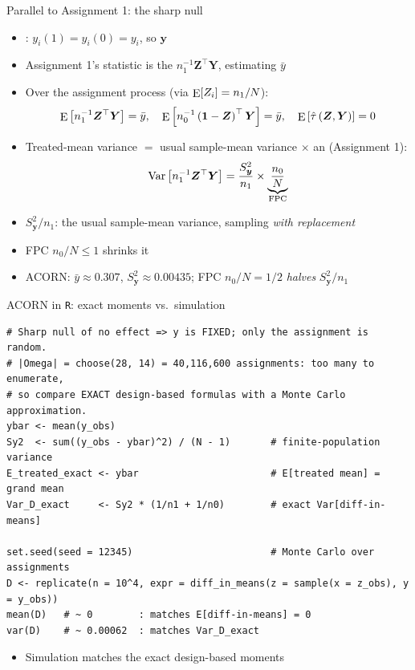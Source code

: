 \documentclass[table, xcolor = {dvipsnames}, 9pt]{beamer}
\theoremstyle{plain}
\newcommand{\mh}[1]{{\color{magenta}{#1}}}
\DeclareMathOperator{\E}{\rm{E}}
\DeclareMathOperator{\Var}{\rm{Var}}
\begin{document}
\begin{frame}[t]{Parallel to Assignment 1: the sharp null}
\small
\begin{itemize} \vfill
\item \mh{Sharp null of no effect}: $y_i(1) = y_i(0) = y_i$, so $\bm{y}$ \mh{fixed} \vfill
\item Assignment 1's statistic is the \mh{treated-group mean} $n_1^{-1}\bm{Z}^{\top}\bm{Y}$, estimating $\bar{y}$ \vfill
\item Over the assignment process (via $\E[Z_i] = n_1/N$): \vfill 
\begin{equation*}
\E\left[n_1^{-1}\bm{Z}^{\top}\bm{Y}\right] = \bar{y}, \quad \E\left[n_0^{-1}\left(\bm{1} - \bm{Z}\right)^{\top}\bm{Y}\right] = \bar{y}, \quad \E\left[\hat{\tau}\left(\bm{Z}, \bm{Y}\right)\right] = 0
\end{equation*} \vfill
\item Treated-mean variance $=$ usual sample-mean variance $\times$ an \mh{FPC} (Assignment 1): \vfill
\begin{equation*}
\Var\left[n_1^{-1}\bm{Z}^{\top}\bm{Y}\right] = \frac{S^2_{\bm{y}}}{n_1} \times \underbrace{\frac{n_0}{N}}_{\text{FPC}}
\end{equation*} \vfill
\item[] $S^2_{\bm{y}}/n_1$: the usual sample-mean variance, sampling \emph{with replacement} \vfill
\item[] FPC $n_0/N \le 1$ shrinks it \vfill
\item ACORN: $\bar{y} \approx 0.307$, $S^2_{\bm{y}} \approx 0.00435$; FPC $n_0/N = 1/2$ \emph{halves} $S^2_{\bm{y}}/n_1$ \vfill
\end{itemize} \vfill
\end{frame}
\begin{frame}[fragile]{ACORN in \texttt{R}: exact moments vs.\ simulation}
\begin{lstlisting}[style=Rstyle, basicstyle=\ttfamily\tiny, frame=single]
# Sharp null of no effect => y is FIXED; only the assignment is random.
# |Omega| = choose(28, 14) = 40,116,600 assignments: too many to enumerate,
# so compare EXACT design-based formulas with a Monte Carlo approximation.
ybar <- mean(y_obs)
Sy2  <- sum((y_obs - ybar)^2) / (N - 1)       # finite-population variance
E_treated_exact <- ybar                       # E[treated mean] = grand mean
Var_D_exact     <- Sy2 * (1/n1 + 1/n0)        # exact Var[diff-in-means]

set.seed(seed = 12345)                        # Monte Carlo over assignments
D <- replicate(n = 10^4, expr = diff_in_means(z = sample(x = z_obs), y = y_obs))
mean(D)   # ~ 0        : matches E[diff-in-means] = 0
var(D)    # ~ 0.00062  : matches Var_D_exact
\end{lstlisting}
\begin{itemize} \vfill
\item Simulation matches the exact design-based moments \vfill
\end{itemize}
\end{frame}
\end{document}
